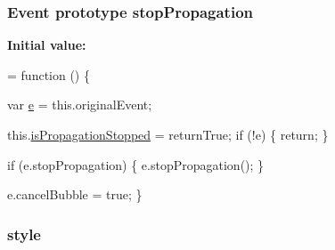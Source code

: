 \subsubsection[{\texorpdfstring{stop\+Propagation}{stopPropagation}}]{ {\bf Event} {\bf prototype} stop\+Propagation}\hypertarget{jquery-2_82_81-vsdoc_8js_ad7254bed2a2157174df61645464ed6b7}{}\label{jquery-2_82_81-vsdoc_8js_ad7254bed2a2157174df61645464ed6b7}
{\bfseries Initial value\+:}
\begin{DoxyCode}
= \textcolor{keyword}{function} () \{
        

        var \hyperlink{packages_2bootstrap_83_83_86_2content_2_scripts_2bootstrap_8min_8js_ab5902775854a8b8440bcd25e0fe1c120}{e} = this.originalEvent;

        this.\hyperlink{jquery-2_82_81-vsdoc_8js_a67f2430529d27bb55dbfa279dc2899ea}{isPropagationStopped} = returnTrue;
        \textcolor{keywordflow}{if} (!e) \{
            \textcolor{keywordflow}{return};
        \}
        
        \textcolor{keywordflow}{if} (e.stopPropagation) \{
            e.stopPropagation();
        \}

        
        
        e.cancelBubble = \textcolor{keyword}{true};
    \}
\end{DoxyCode}
\subsubsection[{\texorpdfstring{style}{style}}]{ style}\hypertarget{jquery-2_82_81-vsdoc_8js_af3f76f18e38dd06c0a345ede43abb420}{}\label{jquery-2_82_81-vsdoc_8js_af3f76f18e38dd06c0a345ede43abb420}
